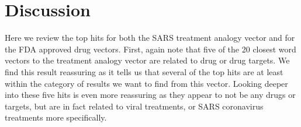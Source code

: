 \documentclass{article}
\begin{document}
\section{Discussion}

Here we review the top hits for both the SARS treatment analogy vector and for the FDA approved drug vectors.
First, again note that five of the 20 closest word vectors to the treatment analogy vector are related to drug or drug targets.
We find this result reassuring as it tells us that several of the top hits are at least within the category of results we want to find from this vector.
Looking deeper into these five hits is even more reassuring as they appear to not be any drugs or targets, but are in fact related to viral treatments, or SARS coronavirus treatments more specifically.
\end{document}
